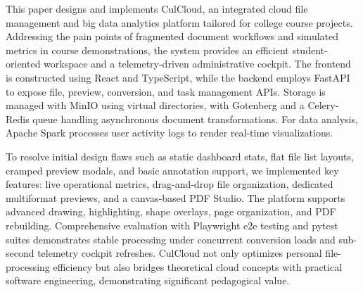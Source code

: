 \begin{abstract*}
  This paper designs and implements CulCloud, an integrated cloud file management and big data analytics platform tailored for college course projects. Addressing the pain points of fragmented document workflows and simulated metrics in course demonstrations, the system provides an efficient student-oriented workspace and a telemetry-driven administrative cockpit. The frontend is constructed using React and TypeScript, while the backend employs FastAPI to expose file, preview, conversion, and task management APIs. Storage is managed with MinIO using virtual directories, with Gotenberg and a Celery-Redis queue handling asynchronous document transformations. For data analysis, Apache Spark processes user activity logs to render real-time visualizations.

  To resolve initial design flaws such as static dashboard stats, flat file list layouts, cramped preview modals, and basic annotation support, we implemented key features: live operational metrics, drag-and-drop file organization, dedicated multiformat previews, and a canvas-based PDF Studio. The platform supports advanced drawing, highlighting, shape overlays, page organization, and PDF rebuilding. Comprehensive evaluation with Playwright e2e testing and pytest suites demonstrates stable processing under concurrent conversion loads and sub-second telemetry cockpit refreshes. CulCloud not only optimizes personal file-processing efficiency but also bridges theoretical cloud concepts with practical software engineering, demonstrating significant pedagogical value.

\end{abstract*}
